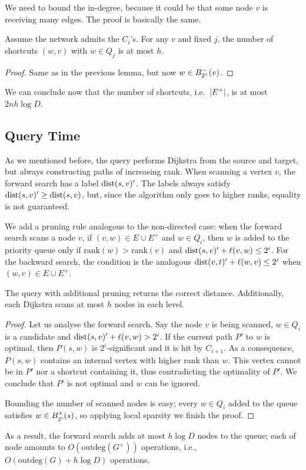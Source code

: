 We need to bound the in-degree, because it could be that some node $v$ is receiving many edges.
The proof is basically the same.
\begin{lemma}
	Assume the network admits the $C_i$'s.
	For any $v$ and fixed $j$, the number of shortcuts $(w,v)$ with $w\in Q_j$ is at most $h$.
\end{lemma}
\begin{proof}
	Same as in the previous lemma, but now $w\in B^-_{2^\gamma}(v)$.
\end{proof}

We can conclude now that the number of shortcuts, i.e.\ $\lvert E^+\rvert$, is at most $2nh\log D$.

\subsection{Query Time}

As we mentioned before, the query performs Dijkstra from the source and target, but always constructing paths of increasing rank.
When scanning a vertex $v$, the forward search has a label $\text{dist}(s,v)'$. 
The labels always satisfy $\text{dist}(s,v)'\geq\text{dist}(s,v)$, but, since the algorithm only goes to higher ranks, equality is not guaranteed.

We add a pruning rule analogous to the non-directed case: when the forward search scans a node $v$, if $(v,w)\in E\cup E^+$ and $w\in Q_i$, then $w$ is added to the priority queue only if $\text{rank}(w)>\text{rank}(v)$ and $\text{dist}(s,v)'+\ell(v,w)\leq 2^i$.
For the backward search, the condition is the analogous $\text{dist}(v,t)'+\ell(w,v)\leq 2^i$ when $(w,v)\in  E\cup E^+$.

\begin{proposition}
	The query with additional pruning returns the correct distance.
	Additionally, each Dijkstra scans at most $h$ nodes in each level.
\end{proposition}
\begin{proof}
	Let us analyse the forward search.
	Say the node $v$ is being scanned, $w\in Q_i$ is a candidate and $\text{dist}(s,v)'+\ell(v,w)>2^i$.
	If the current path $P'$ to $w$ is optimal, then $P(s,w)$ is $2^i$-significant and it is hit by $C_{i+1}$. 
	As a consequence, $P(s,w)$ contains an internal vertex with higher rank than $w$.
	This vertex cannot be in $P'$ nor a shortcut containing it, thus contradicting the optimality of $P'$.
	We conclude that $P'$ is not optimal and $w$ can be ignored.
	
	Bounding the number of scanned nodes is easy; every $w\in Q_i$ added to the queue satisfies $w\in B^+_{2^i}(s)$, so applying local sparsity we finish the proof.
\end{proof}

As a result, the forward search adds at most $h\log D$ nodes to the queue;
each of node amounts to $O(\text{outdeg} (G^+))$ operations, i.e., $O(\text{outdeg}(G) + h\log D)$ operations.
